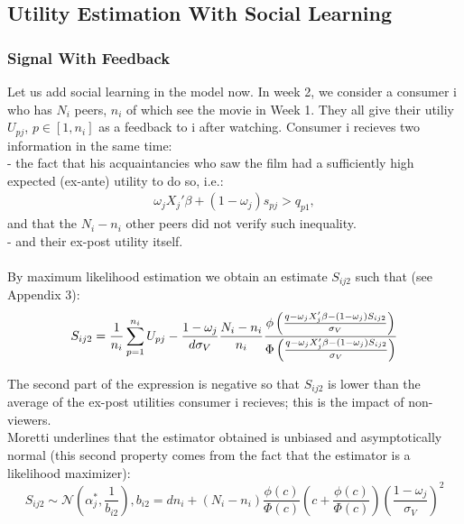 \subsection{Utility Estimation With Social Learning}	
	
\subsubsection{Signal With Feedback}
Let us add social learning in the model now. In week 2, we consider a consumer i who has $N_{i}$ peers, $n_{i}$ of which see the movie in Week 1. They all give their utiliy $U_{p j }$, $p\in[1,n_{i}]$ as a feedback to i after watching. Consumer i recieves two information in the same time:\\
- the fact that his acquaintancies who saw the film had a sufficiently high expected (ex-ante) utility to do so, i.e.:
\begin{align*}
	\omega_{j} X_{j}'\beta+(1-\omega_{j})s_{p j}>q_{p 1},
\end{align*}
and that the $N_{i}-n_{i}$ other peers did not verify such inequality.\\
- and their ex-post utility itself.\\\\
By maximum likelihood estimation we obtain an estimate $S_{i j 2}$ such that (see Appendix 3):
\begin{equation}
	S_{i j 2}=\frac{1}{n_{i}}\sum_{p=1}^{n_{i}}U_{p j}-\frac{1-\omega_{j}}{d\sigma_{V}}\frac{N_{i}-n_{i}}{n_{i}}\frac{\phi\left(\frac{q-\omega_{j}X'_{j}\beta-(1-\omega_{j})S_{i j 2}}{\sigma_{V}}\right)}{\Phi\left(\frac{q-\omega_{j}X'_{j}\beta-(1-\omega_{j})S_{i j 2}}{\sigma_{V}}\right)}\\
\end{equation}
	
The second part of the expression is negative so that $S_{i j 2}$ is lower than the average of the ex-post utilities consumer i recieves; this is the impact of non-viewers.\\
	
Moretti underlines that the estimator obtained is unbiased and asymptotically normal (this second property comes from the fact that the estimator is a likelihood maximizer): 
\begin{equation}
	S_{i j 2}\sim\mathcal{N}(\alpha_{j}^{*}, \frac{1}{b_{i 2}}) , b_{i 2}=dn_{i}+(N_{i}-n_{i})\frac{\phi(c)}{\Phi(c)}\left(c+\frac{\phi(c)}{\Phi(c)}\right)(\frac{1-\omega_{j}}{\sigma_{V}})^{2}
\end{equation}\\
	
